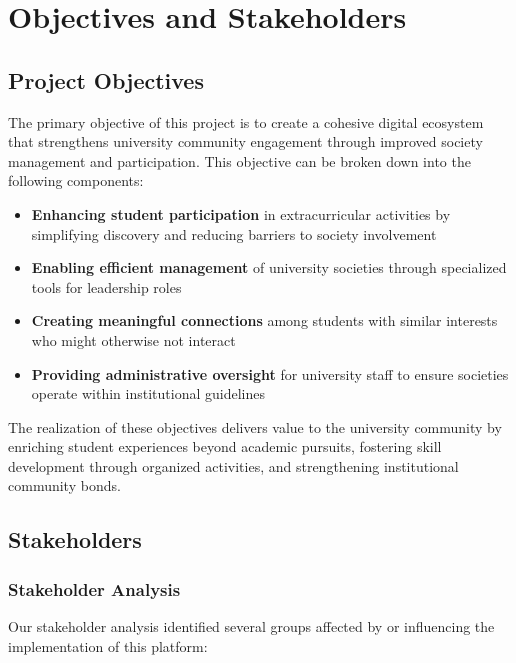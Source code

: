 \chapter{Objectives and Stakeholders}

\section{Project Objectives}

The primary objective of this project is to create a cohesive digital ecosystem that strengthens university community engagement through improved society management and participation. This objective can be broken down into the following components:

\begin{itemize}
    \item \textbf{Enhancing student participation} in extracurricular activities by simplifying discovery and reducing barriers to society involvement
    \item \textbf{Enabling efficient management} of university societies through specialized tools for leadership roles
    \item \textbf{Creating meaningful connections} among students with similar interests who might otherwise not interact
    \item \textbf{Providing administrative oversight} for university staff to ensure societies operate within institutional guidelines
\end{itemize}

The realization of these objectives delivers value to the university community by enriching student experiences beyond academic pursuits, fostering skill development through organized activities, and strengthening institutional community bonds.

\section{Stakeholders}

\subsection{Stakeholder Analysis}

Our stakeholder analysis identified several groups affected by or influencing the implementation of this platform:

